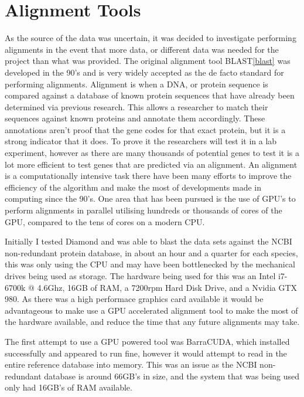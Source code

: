 \section{Alignment Tools}

As the source of the data was uncertain, it was decided to investigate performing alignments in the event that more data, or different data was needed for the project than what was provided. The original alignment tool BLAST\ref{blast} was developed in the 90's and is very widely accepted as the de facto standard for performing alignments. Alignment is when a DNA, or protein sequence is compared against a database of known protein sequences that have already been determined via previous research. This allows a researcher to match their sequences against known proteins and annotate them accordingly. These annotations aren't proof that the gene codes for that exact protein, but it is a strong indicator that it does. To prove it the researchers will test it in a lab experiment, however as there are many thousands of potential genes to test it is a lot more efficient to test genes that are predicted via an alignment. An alignment is a computationally intensive task there have been many efforts to improve the efficiency of the algorithm and make the most of developments made in computing since the 90's. One area that has been pursued is the use of GPU's to perform alignments in parallel utilising hundreds or thousands of cores of the GPU, compared to the tens of cores on a modern CPU. 

Initially I tested Diamond\cite{diamond} and was able to blast the data sets against the NCBI\cite{ncbi} non-redundant protein database, in about an hour and a quarter for each species, this was only using the CPU and may have been bottlenecked by the mechanical drives being used as storage. The hardware being used for this was an Intel i7-6700k @ 4.6Ghz, 16GB of RAM, a 7200rpm Hard Disk Drive, and a Nvidia GTX 980. As there was a high performace graphics card available it would be advantageous to make use a GPU accelerated alignment tool to make the most of the hardware available, and reduce the time that any future alignments may take. 

The first attempt to use a GPU powered tool was BarraCUDA\cite{barracuda}, which installed successfully and appeared to run fine, however it would attempt to read in the entire reference database into memory. This was an issue as the NCBI non-redundant database is around 66GB's in size, and the system that was being used only had 16GB's of RAM available. 

